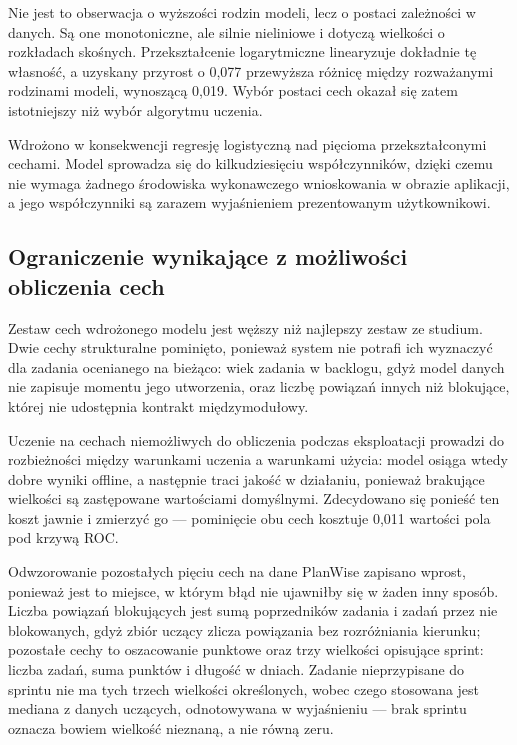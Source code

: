 Nie jest to obserwacja o wyższości rodzin modeli, lecz o postaci zależności w danych. Są one monotoniczne, ale silnie nieliniowe i dotyczą wielkości o rozkładach skośnych. Przekształcenie logarytmiczne linearyzuje dokładnie tę własność, a uzyskany przyrost o 0,077 przewyższa różnicę między rozważanymi rodzinami modeli, wynoszącą 0,019. Wybór postaci cech okazał się zatem istotniejszy niż wybór algorytmu uczenia.

Wdrożono w konsekwencji regresję logistyczną nad pięcioma przekształconymi cechami. Model sprowadza się do kilkudziesięciu współczynników, dzięki czemu nie wymaga żadnego środowiska wykonawczego wnioskowania w obrazie aplikacji, a jego współczynniki są zarazem wyjaśnieniem prezentowanym użytkownikowi.

\subsection{Ograniczenie wynikające z możliwości obliczenia cech}

Zestaw cech wdrożonego modelu jest węższy niż najlepszy zestaw ze studium. Dwie cechy strukturalne pominięto, ponieważ system nie potrafi ich wyznaczyć dla zadania ocenianego na bieżąco: wiek zadania w backlogu, gdyż model danych nie zapisuje momentu jego utworzenia, oraz liczbę powiązań innych niż blokujące, której nie udostępnia kontrakt międzymodułowy.

Uczenie na cechach niemożliwych do obliczenia podczas eksploatacji prowadzi do rozbieżności między warunkami uczenia a warunkami użycia: model osiąga wtedy dobre wyniki offline, a następnie traci jakość w działaniu, ponieważ brakujące wielkości są zastępowane wartościami domyślnymi. Zdecydowano się ponieść ten koszt jawnie i zmierzyć go — pominięcie obu cech kosztuje 0,011 wartości pola pod krzywą ROC.

Odwzorowanie pozostałych pięciu cech na dane PlanWise zapisano wprost, ponieważ jest to miejsce, w którym błąd nie ujawniłby się w żaden inny sposób. Liczba powiązań blokujących jest sumą poprzedników zadania i zadań przez nie blokowanych, gdyż zbiór uczący zlicza powiązania bez rozróżniania kierunku; pozostałe cechy to oszacowanie punktowe oraz trzy wielkości opisujące sprint: liczba zadań, suma punktów i długość w dniach. Zadanie nieprzypisane do sprintu nie ma tych trzech wielkości określonych, wobec czego stosowana jest mediana z danych uczących, odnotowywana w wyjaśnieniu — brak sprintu oznacza bowiem wielkość nieznaną, a nie równą zeru.


